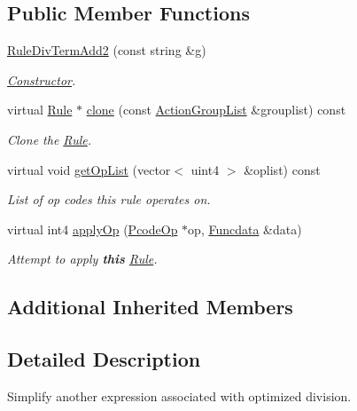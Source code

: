 \subsection*{Public Member Functions}
\begin{DoxyCompactItemize}
\item 
\mbox{\hyperlink{class_rule_div_term_add2_a0807064b337e0e8660602b22f839b7e0}{Rule\+Div\+Term\+Add2}} (const string \&g)
\begin{DoxyCompactList}\small\item\em \mbox{\hyperlink{class_constructor}{Constructor}}. \end{DoxyCompactList}\item 
virtual \mbox{\hyperlink{class_rule}{Rule}} $\ast$ \mbox{\hyperlink{class_rule_div_term_add2_a96c85869d2834b58cbc49a940eecd53d}{clone}} (const \mbox{\hyperlink{class_action_group_list}{Action\+Group\+List}} \&grouplist) const
\begin{DoxyCompactList}\small\item\em Clone the \mbox{\hyperlink{class_rule}{Rule}}. \end{DoxyCompactList}\item 
virtual void \mbox{\hyperlink{class_rule_div_term_add2_a54b666a499dfbc3547349e3c1dafe3da}{get\+Op\+List}} (vector$<$ uint4 $>$ \&oplist) const
\begin{DoxyCompactList}\small\item\em List of op codes this rule operates on. \end{DoxyCompactList}\item 
virtual int4 \mbox{\hyperlink{class_rule_div_term_add2_abc720625170593b9f1bd43748c2be78c}{apply\+Op}} (\mbox{\hyperlink{class_pcode_op}{Pcode\+Op}} $\ast$op, \mbox{\hyperlink{class_funcdata}{Funcdata}} \&data)
\begin{DoxyCompactList}\small\item\em Attempt to apply {\bfseries{this}} \mbox{\hyperlink{class_rule}{Rule}}. \end{DoxyCompactList}\end{DoxyCompactItemize}
\subsection*{Additional Inherited Members}


\subsection{Detailed Description}
Simplify another expression associated with optimized division. 

